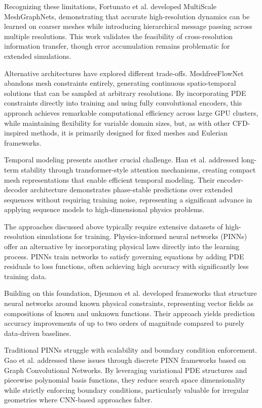 Recognizing these limitations, Fortunato et al. \cite{fortunatoMultiScaleMeshGraphNets2022} developed MultiScale MeshGraphNets, demonstrating that accurate high-resolution dynamics can be learned on coarser meshes while introducing hierarchical message passing across multiple resolutions. This work validates the feasibility of cross-resolution information transfer, though error accumulation remains problematic for extended simulations.

Alternative architectures have explored different trade-offs. MeshfreeFlowNet \cite{jiangMeshfreeFlowNetPhysicsConstrainedDeep2020} abandons mesh constraints entirely, generating continuous spatio-temporal solutions that can be sampled at arbitrary resolutions. By incorporating PDE constraints directly into training and using fully convolutional encoders, this approach achieves remarkable computational efficiency across large GPU clusters, while maintaining flexibility for variable domain sizes, but, as with other CFD-inspired methods, it is primarily designed for fixed meshes and Eulerian frameworks.

Temporal modeling presents another crucial challenge. Han et al. \cite{hanPredictingPhysicsMeshreduced2022a} addressed long-term stability through transformer-style attention mechanisms, creating compact mesh representations that enable efficient temporal modeling. Their encoder-decoder architecture demonstrates phase-stable predictions over extended sequences without requiring training noise, representing a significant advance in applying sequence models to high-dimensional physics problems.

The approaches discussed above typically require extensive datasets of high-resolution simulations for training. Physics-informed neural networks (PINNs) \cite{raissi2024physicsinformedneuralnetworksextensions} offer an alternative by incorporating physical laws directly into the learning process. PINNs train networks to satisfy governing equations by adding PDE residuals to loss functions, often achieving high accuracy with significantly less training data.

Building on this foundation, Djeumou et al. \cite{djeumouNeuralNetworksPhysicsInformed2022} developed frameworks that structure neural networks around known physical constraints, representing vector fields as compositions of known and unknown functions. Their approach yields prediction accuracy improvements of up to two orders of magnitude compared to purely data-driven baselines.

Traditional PINNs struggle with scalability and boundary condition enforcement. Gao et al. \cite{gaoPhysicsinformedGraphNeural2022} addressed these issues through discrete PINN frameworks based on Graph Convolutional Networks. By leveraging variational PDE structures and piecewise polynomial basis functions, they reduce search space dimensionality while strictly enforcing boundary conditions, particularly valuable for irregular geometries where CNN-based approaches falter.

